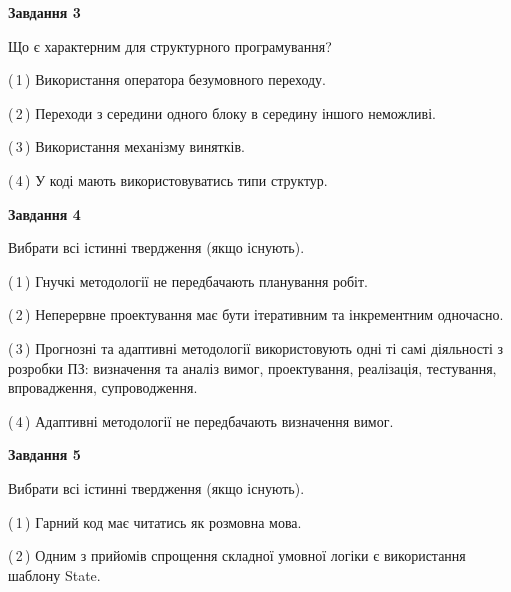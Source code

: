\documentclass[10pt, ukrainian]{article}
\begin{document}
{\begin {large}
{\begin {center}\textbf{Завдання 3}\end {center}}\par
Що є характерним для структурного програмування?\par
\vspace{2mm}



(\,1\,) Використання оператора безумовного переходу. %



(\,2\,) Переходи з середини одного блоку в середину іншого неможливі. %



(\,3\,) Використання механізму винятків. %



(\,4\,) У коді мають використовуватись типи структур. %


{\begin {center}\textbf{Завдання 4}\end {center}}\par
Вибрати всі істинні твердження (якщо існують).\par
\vspace{2mm}



(\,1\,) Гнучкі методології не передбачають планування робіт. %



(\,2\,) Неперервне проектування має бути ітеративним та інкрементним одночасно. %



(\,3\,) Прогнозні та адаптивні методології використовують одні ті самі діяльності з розробки ПЗ: визначення та аналіз вимог, проектування, реалізація, тестування, впровадження, супроводження. %



(\,4\,) Адаптивні методології не передбачають визначення вимог. %


{\begin {center}\textbf{Завдання 5}\end {center}}\par
Вибрати всі істинні твердження (якщо існують).\par
\vspace{2mm}



(\,1\,) Гарний код має читатись як розмовна мова. %



(\,2\,) Одним з прийомів спрощення складної умовної логіки є використання шаблону State. %




\end{large}}
\end{document}
